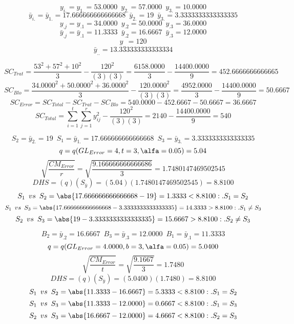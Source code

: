 




$$y_{i.}=y_{1.}=53.0000 \enspace y_{2.}=57.0000 \enspace y_{3.}=10.0000$$
$$\bar{y}_{i.}=\bar{y}_{1.}=17.666666666666668 \enspace \bar{y}_{2.}=19 \enspace \bar{y}_{3.}=3.3333333333333335$$
$$y_{.j}=y_{.1}=34.0000 \enspace y_{.2}=50.0000 \enspace y_{.3}=36.0000$$
$$\bar{y}_{.j}=\bar{y}_{.1}=11.3333 \enspace \bar{y}_{.2}=16.6667 \enspace \bar{y}_{.3}=12.0000$$
$$y_{..}=120$$
$$\bar{y}_{..}=13.333333333333334$$

$$SC_{Trat}=\frac{53^{2}+57^{2}+10^{2}}{3}-\frac{120^{2}}{(3)(3)}=\frac{6158.0000}{3}-\frac{14400.0000}{9}=452.6666666666665$$
$$SC_{Blo}=\frac{34.0000^{2}+50.0000^{2}+36.0000^{2}}{3}-\frac{120.0000^{2}}{(3)(3)}=\frac{4952.0000}{3}-\frac{14400.0000}{9}=50.6667$$
$$SC_{Error}=SC_{Total}-SC_{Trat}-SC_{Blo}=540.0000-452.6667-50.6667=36.6667$$
$$SC_{Total}=\sum_{i=1}^{\mathit{t}}\sum_{j=1}^{\mathit{r}}y_{ij}^{2}-\frac{120^{2}}{(3)(3)}=2140-\frac{14400.0000}{9}=540$$

$$S_{2}=\bar{y}_{2.}=19 \enspace S_{1}=\bar{y}_{1.}=17.666666666666668 \enspace S_{3}=\bar{y}_{3.}=3.3333333333333335$$
$$q=q(GL_{Error}=4, t=3, \alfa=0.05)=5.04$$
$$\sqrt{\frac{CM_{Error}}{r}}=\sqrt{\frac{9.166666666666686}{3}}=1.7480147469502545$$
$$DHS=(q)(S_{\bar{y}})=(5.04)(1.7480147469502545)=8.8100$$
$$S_{1} \enspace vs \enspace S_{2} = \abs{17.666666666666668-19}=1.3333<8.8100:.S_{1}=S_{2}$$
$$S_{1} \enspace vs \enspace S_{3} = \abs{17.666666666666668-3.3333333333333335}=14.3333>8.8100:.S_{1}\not=S_{3}$$
$$S_{2} \enspace vs \enspace S_{3} = \abs{19-3.3333333333333335}=15.6667>8.8100:.S_{2}\not=S_{3}$$


$$B_{2}=\bar{y}_{.2}=16.6667 \enspace B_{3}=\bar{y}_{.3}=12.0000 \enspace B_{1}=\bar{y}_{.1}=11.3333$$
$$q=q(GL_{Error}=4.0000, b=3, \alfa=0.05)=5.0400$$
$$\sqrt{\frac{CM_{Error}}{t}}=\sqrt{\frac{9.1667}{3}}=1.7480$$
$$DHS=(q)(S_{\bar{y}})=(5.0400)(1.7480)=8.8100$$
$$S_{1} \enspace vs \enspace S_{2} = \abs{11.3333-16.6667}=5.3333<8.8100:.S_{1}=S_{2}$$
$$S_{1} \enspace vs \enspace S_{3} = \abs{11.3333-12.0000}=0.6667<8.8100:.S_{1}=S_{3}$$
$$S_{2} \enspace vs \enspace S_{3} = \abs{16.6667-12.0000}=4.6667<8.8100:.S_{2}=S_{3}$$